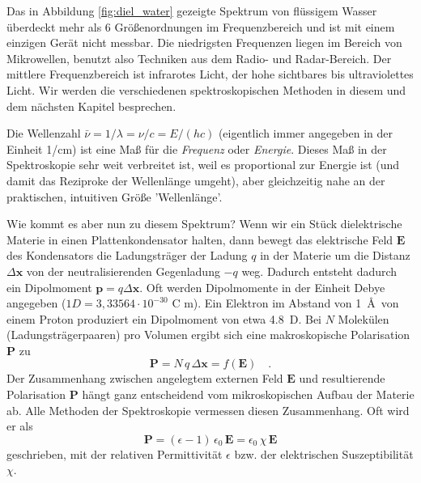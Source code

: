 Das in Abbildung \ref{fig:diel_water}  gezeigte Spektrum von flüssigem Wasser überdeckt mehr als 6 Größenordnungen im Frequenzbereich und ist mit einem einzigen Gerät nicht  messbar. Die niedrigsten Frequenzen liegen im Bereich von Mikrowellen, benutzt also Techniken aus dem Radio- und Radar-Bereich. Der mittlere Frequenzbereich ist infrarotes Licht, der hohe sichtbares bis ultraviolettes Licht. Wir werden die verschiedenen spektroskopischen Methoden in diesem und dem nächsten  Kapitel besprechen.


Die Wellenzahl $\bar{\nu} = 1 / \lambda =\nu / c =  E / (h c)$ (eigentlich immer angegeben in der Einheit 1/cm) ist eine Maß für die  \emph{Frequenz} oder \emph{Energie}. Dieses Maß in der Spektroskopie sehr weit verbreitet ist, weil es proportional zur Energie ist (und damit das Reziproke der Wellenlänge umgeht), aber gleichzeitig nahe an der praktischen, intuitiven Größe 'Wellenlänge'.




Wie kommt es aber nun zu diesem Spektrum? Wenn wir ein Stück dielektrische Materie in einen Plattenkondensator halten, dann bewegt das elektrische Feld $\mathbf{E}$ des Kondensators die Ladungsträger der Ladung $q$ in der Materie um  die Distanz $\Delta  \mathbf{x}$ von der neutralisierenden Gegenladung $-q$ weg. Dadurch entsteht dadurch ein Dipolmoment $\mathbf{p} = q \Delta \mathbf{x}$. Oft werden Dipolmomente in der Einheit Debye angegeben ($1 D = 3{,}33564 \cdot 10^{-30}$ C  m). Ein Elektron im Abstand von 1~\AA\ von einem Proton produziert ein Dipolmoment von etwa 4.8~D. Bei $N$ Molekülen (Ladungsträgerpaaren) pro Volumen ergibt sich eine makroskopische Polarisation $\mathbf{P}$ zu
\begin{equation}
\mathbf{P} = N \, q \, \Delta \mathbf{x} = f(\mathbf{E}) \quad .
\end{equation}
Der Zusammenhang zwischen angelegtem externen Feld $\mathbf{E}$ und resultierende 
Polarisation $\mathbf{P}$ hängt ganz entscheidend vom mikroskopischen Aufbau der Materie ab. Alle Methoden der Spektroskopie vermessen diesen Zusammenhang. Oft wird er als 
\begin{equation}
 \mathbf{P} =  (\epsilon - 1) \, \epsilon_0 \, \mathbf{E} = \epsilon_0 \,\chi \, \mathbf{E} 
 \label{eq:diel_p_lin}
\end{equation}
geschrieben, mit der relativen Permittivität $\epsilon$ bzw. der elektrischen Suszeptibilität $\chi$. 


